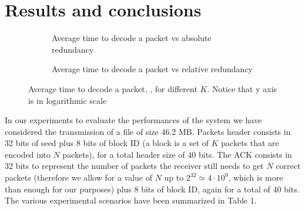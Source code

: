\section{Results and conclusions}
\setlength{\abovecaptionskip}{0pt plus 0pt minus 2pt}



\begin{figure}[t!]
\centering
\captionsetup{justification=centering,font=scriptsize}
\begin{subfigure}{0.4\textwidth}
	\captionsetup{justification=centering,font=scriptsize}
	\setlength{}
	\setlength{}
	
	\caption{Average time to decode a packet vs absolute redundancy}
	\label{fig:decoding_time}
\end{subfigure}\hspace{2em}%
\begin{subfigure}{0.4\textwidth}
	\captionsetup{justification=centering,font=scriptsize}
	\setlength{}
	\setlength{}
	
	\caption{Average time to decode a packet vs relative redundancy}
	\label{fig:decoding_time_rel}
\end{subfigure}
\caption{Average time to decode a packet, , for different $K$. Notice that y axis is in logarithmic scale}
\label{fig:dc_all}
\end{figure}

In our experiments to evaluate the performances of the system we have considered the transmission of a file of size 46.2 MB. Packets header consists in 32 bits of seed plus 8 bits of block ID (a block is a set of $K$ packets that are encoded into $N$ packets), for a total header size of 40 bits. The ACK consists in 32 bits to represent the number of packets the receiver still needs to get $N$ correct packets (therefore we allow for a value of $N$ up to $2^{32}\simeq 4\cdot 10^9$, which is more than enough for our purposes) plus 8 bits of block ID, again for a total of 40 bits. The various experimental scenarios have been summarized in Table 1.

